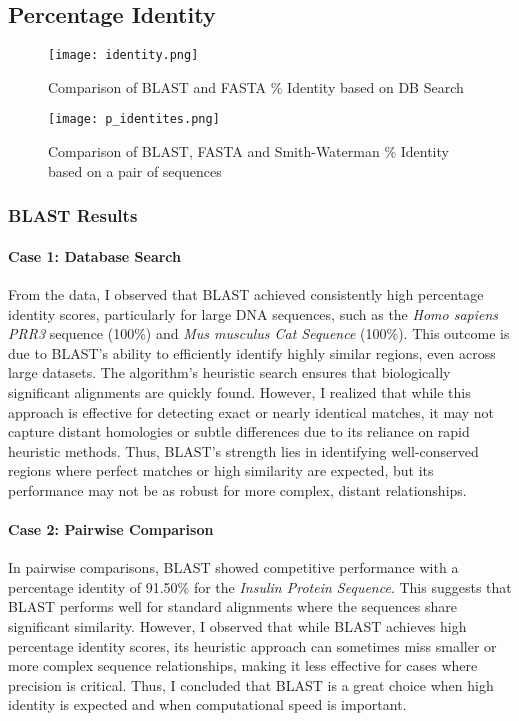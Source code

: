 \documentclass{article}
\begin{document}
\subsection{Percentage Identity}
\begin{figure}[H]
  \centering
  \texttt{[image: identity.png]}
  \caption{Comparison of BLAST and FASTA \% Identity based on DB Search}
  \label{fig:yourlabel}
\end{figure}
\begin{figure}[H]
  \centering
  \texttt{[image: p\_identites.png]}
  \caption{Comparison of BLAST, FASTA and Smith-Waterman \% Identity based on a pair of sequences}
  \label{fig:yourlabel}
\end{figure}

\subsubsection{ BLAST Results}

\paragraph{Case 1: Database Search}
From the data, I observed that BLAST achieved consistently high percentage identity scores, particularly for large DNA sequences, such as the \textit{Homo sapiens PRR3} sequence (100\%) and \textit{Mus musculus Cat Sequence} (100\%). This outcome is due to BLAST’s ability to efficiently identify highly similar regions, even across large datasets. The algorithm’s heuristic search ensures that biologically significant alignments are quickly found. However, I realized that while this approach is effective for detecting exact or nearly identical matches, it may not capture distant homologies or subtle differences due to its reliance on rapid heuristic methods. Thus, BLAST’s strength lies in identifying well-conserved regions where perfect matches or high similarity are expected, but its performance may not be as robust for more complex, distant relationships.

\paragraph{Case 2: Pairwise Comparison}
In pairwise comparisons, BLAST showed competitive performance with a percentage identity of 91.50\% for the \textit{Insulin Protein Sequence}. This suggests that BLAST performs well for standard alignments where the sequences share significant similarity. However, I observed that while BLAST achieves high percentage identity scores, its heuristic approach can sometimes miss smaller or more complex sequence relationships, making it less effective for cases where precision is critical. Thus, I concluded that BLAST is a great choice when high identity is expected and when computational speed is important.
\end{document}
